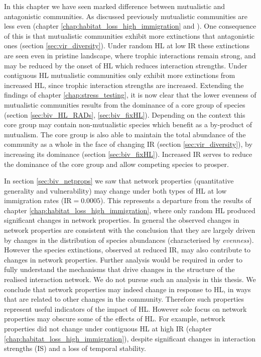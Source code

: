 In this chapter we have seen marked difference between mutualistic and antagonistic communities. As discussed previously mutualistic communities are less even (chapter \ref{chap:habitat_loss_high_immigration} and \cite{lurgi2015effects}). One consequence of this is that mutualistic communities exhibit more extinctions that antagonistic ones (section \ref{sec:vir_diversity}). Under random HL at low IR these extinctions are seen even in pristine landscape, where trophic interactions remain strong, and may be reduced by the onset of HL which reduces interaction strengths. Under contiguous HL mutualistic communities only exhibit more extinctions from increased HL, since trophic interaction strengths are increased. Extending the findings of chapter \ref{chap:stress_testing}, it is now clear that the lower evenness of mutualistic communities results from the dominance of a core group of species (section \ref{sec:biv_HL_RADs}, \ref{sec:biv_fixHL}). Depending on the context this core group may contain non-mutualistic species which benefit as a by-product of mutualism. The core group is also able to maintain the total abundance of the community as a whole in the face of changing IR (section \ref{sec:vir_diversity}), by increasing its dominance (section \ref{sec:biv_fixHL}). Increased IR serves to reduce the dominance of the core group and allow competing species to prosper.

In section \ref{sec:biv_netprops} we saw that network properties (quantitative generality and vulnerability) may change under both types of HL at low immigration rates (IR$=0.0005$). This represents a departure from the results of chapter \ref{chap:habitat_loss_high_immigration}, where only random HL produced significant changes in network properties. In general the observed changes in network properties are consistent with the conclusion that they are largely driven by changes in the distribution of species abundances (characterised by \emph{evenness}). However the species extinctions, observed at reduced IR, may also contribute to changes in network properties. Further analysis would be required in order to fully understand the mechanisms that drive changes in the structure of the realised interaction network. We do not pursue such an analysis in this thesis. We conclude that network properties may indeed change in response to HL, in ways that are related to other changes in the community. Therefore such properties represent useful indicators of the impact of HL. However sole focus on network properties may obscure some of the effects of HL. For example, network properties did not change under contiguous HL at high IR (chapter \ref{chap:habitat_loss_high_immigration}), despite significant changes in interaction strengths (IS) and a loss of temporal stability.    

